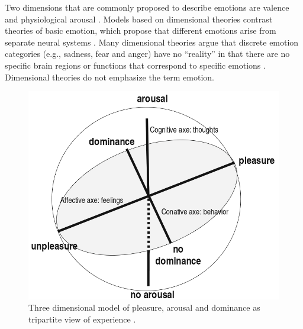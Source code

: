 \documentclass[12pt]{report}
\begin{document}
Two dimensions that are commonly proposed to describe emotions are valence and
physiological arousal \cite{arnold:emotion-personality}
\cite{lazarus:cognitive-theory-emotion} \cite{russell:circumplex-affect}. Models
based on dimensional theories contrast theories of basic emotion, which propose
that different emotions arise from separate neural systems
\cite{posner:circumplex-affect}. Many dimensional theories argue that discrete
emotion categories (e.g., sadness, fear and anger) have no ``reality'' in that
there are no specific brain regions or functions that correspond to specific
emotions \cite{barrett:emotions-natural}. Dimensional theories do not emphasize
the term emotion.

\begin{figure}[tbh]
  \center
  \includegraphics[width=.6\textwidth]{figure/dimensional2.png}
  \caption{Three dimensional model of pleasure, arousal and dominance as
  tripartite view of experience \cite{mehrabian:pad}.}
  \label{fig:pad}
\end{figure}
\end{document}
